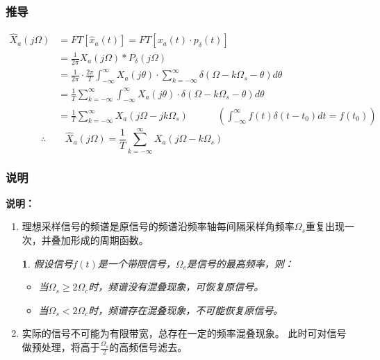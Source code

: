 \documentclass[notheorems,compress,mathserif,table]{beamer}
\newtheorem{dablock}{}
\begin{document}
\begin{frame}[shrink]\frametitle{推导}%
\begin{equation*}
\begin{split}
  \hat{X}_a(j\Omega)
         &=  FT\left[\hat{x}_a(t)\right] = FT\left[x_a(t)\cdot p_{\delta}(t) \right]
                      \quad\quad\quad\quad\quad\quad\quad\quad\\
         &=  \frac{1}{2\pi}X_a(j\Omega) * P_{\delta}(j\Omega)\\
         &=  \frac{1}{2\pi}\cdot \frac{2\pi}{T}\int_{-\infty}^{\infty}X_a(j\theta)\cdot
             \sum_{k=-\infty}^{\infty}\delta(\Omega- k \Omega_s-\theta)d\theta \\
         &=  \frac{1}{T}\sum_{k=-\infty}^{\infty}\int_{-\infty}^{\infty}
             X_a(j\theta)\cdot \delta(\Omega - k \Omega_s-\theta) d\theta \\
         &=  \frac{1}{T}\sum_{k=-\infty}^{\infty}X_a(j\Omega -j k \Omega_s)
             \quad\quad\quad \left(\int_{-\infty}^{\infty}f(t)\delta(t-t_0)dt = f(t_0)\right)\qquad
\end{split}
\end{equation*}
$$\therefore \quad\quad
\hat{X}_a(j\Omega)   =  \frac{1}{T}\sum_{k=-\infty}^{\infty}X_a(j\Omega -k \Omega_s)
\quad\quad\quad\quad\quad\quad\quad\quad\quad\quad
$$
\end{frame}
%
%
%
\begin{frame}[shrink]\frametitle{说明}%
\textbf{说明：}
\begin{enumerate}
  \item
      理想采样信号的频谱是原信号的频谱沿频率轴每间隔采样角频率$\Omega_s$重复出现一次，并叠加形成的周期函数。
      \newline%
      \begin{dablock}
        假设信号$f(t)$是一个带限信号，$\Omega_c$是信号的最高频率，则：
          \begin{itemize}
            \item 当$\Omega_s \geq 2\Omega_c$时，频谱没有混叠现象，可恢复原信号。
            \item 当$\Omega_s < 2\Omega_c$时，频谱存在混叠现象，不可能恢复原信号。
          \end{itemize}
      \end{dablock}
  \item
      实际的信号不可能为有限带宽，总存在一定的频率混叠现象。%
      \newline%
      此时可对信号做预处理，将高于$\frac{\Omega_s}{2}$的高频信号滤去。
\end{enumerate}

\end{frame}
\end{document}

